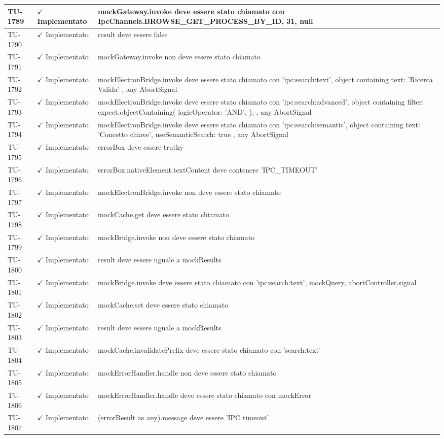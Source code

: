 ﻿\documentclass[a4paper,12pt]{article}
\newcommand{\ok}{\textcolor{green!60!black}{$\checkmark$ Implementato}}
\begin{document}
\begin{longtable}{|p{2cm}|p{3.5cm}|p{9.5cm}|}
\hline
TU-1789 & \ok & mockGateway.invoke deve essere stato chiamato con IpcChannels.BROWSE\_GET\_PROCESS\_BY\_ID, 31, null \\
\hline
TU-1790 & \ok & result deve essere false \\
\hline
TU-1791 & \ok & mockGateway.invoke non deve essere stato chiamato \\
\hline
TU-1792 & \ok & mockElectronBridge.invoke deve essere stato chiamato con 'ipc:search:text', object containing { text: 'Ricerca Valida' }, any AbortSignal \\
\hline
TU-1793 & \ok & mockElectronBridge.invoke deve essere stato chiamato con 'ipc:search:advanced', object containing { filter: expect.objectContaining({ logicOperator: 'AND', }), }, any AbortSignal \\
\hline
TU-1794 & \ok & mockElectronBridge.invoke deve essere stato chiamato con 'ipc:search:semantic', object containing { text: 'Concetto chiave', useSemanticSearch: true }, any AbortSignal \\
\hline
TU-1795 & \ok & errorBox deve essere truthy \\
\hline
TU-1796 & \ok & errorBox.nativeElement.textContent deve contenere 'IPC\_TIMEOUT' \\
\hline
TU-1797 & \ok & mockElectronBridge.invoke non deve essere stato chiamato \\
\hline
TU-1798 & \ok & mockCache.get deve essere stato chiamato \\
\hline
TU-1799 & \ok & mockBridge.invoke non deve essere stato chiamato \\
\hline
TU-1800 & \ok & result deve essere uguale a mockResults \\
\hline
TU-1801 & \ok & mockBridge.invoke deve essere stato chiamato con 'ipc:search:text', mockQuery, abortController.signal \\
\hline
TU-1802 & \ok & mockCache.set deve essere stato chiamato \\
\hline
TU-1803 & \ok & result deve essere uguale a mockResults \\
\hline
TU-1804 & \ok & mockCache.invalidatePrefix deve essere stato chiamato con 'search:text' \\
\hline
TU-1805 & \ok & mockErrorHandler.handle non deve essere stato chiamato \\
\hline
TU-1806 & \ok & mockErrorHandler.handle deve essere stato chiamato con mockError \\
\hline
TU-1807 & \ok & (errorResult as any).message deve essere 'IPC timeout' \\

\end{longtable}
\end{document}
